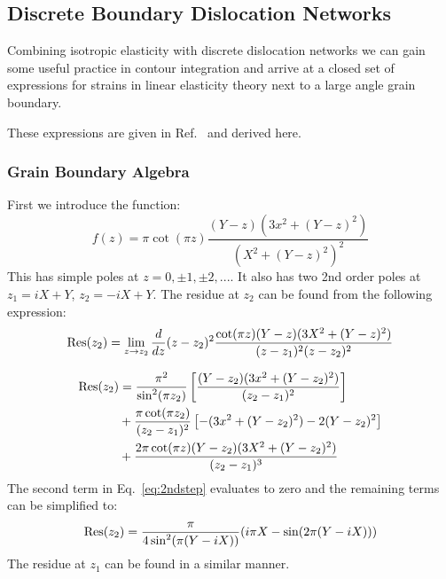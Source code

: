 \subsection{Discrete Boundary Dislocation Networks}
Combining isotropic elasticity with discrete dislocation networks
we can gain some useful practice in contour integration and arrive
at a closed set of expressions for strains in linear elasticity
theory next to a large angle grain boundary. 

These expressions are given in Ref.~\cite{sutton95} and derived here.

\subsubsection{Grain Boundary Algebra}
\label{gbalgebra}
First we introduce the function:
%
\begin{equation}
f(z) =  \pi\cot(\pi z)\frac{(Y-z)(3x^{2} + (Y-z)^{2})}{(X^{2} + (Y-z)^{2})^{2}}
\end{equation}
%
This has simple poles at $z = 0, \pm 1, \pm 2,...$. It also has two 2nd 
order poles at  $z_{1}=iX+Y$, $z_{2}=-iX+Y$. The residue at $z_{2}$ can
be found from the following expression: 
%
\begin{equation}
{\rm Res}(z_{2}) = \lim_{z\rightarrow z_{2}}\frac{d}{dz}(z-z_{2})^{2}
\frac{\cot(\pi z)(Y-z)(3X^{2}+(Y-z)^2)}{(z-z_{1})^{2}(z-z_{2})^{2}}
\end{equation}


\begin{align}
\label{eq:2ndstep}
{\rm Res}(z_{2})&=\frac{\pi^{2}}{\sin^{2}(\pi z_{2})}\left[\frac{(Y-z_{2})(3x^{2}+(Y-z_{2})^{2})}{(z_{2}-z_{1})^{2}}\right]\\
  &+\frac{\pi\cot(\pi z_{2})}{(z_{2}-z_{1})^{2}}\left[-(3x^{2} + (Y-z_{2})^{2})-2(Y-z_{2})^{2}\right] \\
  &+\frac{2\pi\cot(\pi z)(Y-z_{2})(3X^{2}+(Y-z_{2})^{2})}{(z_{2} - z_{1})^{3}}
\end{align}
%
The second term in Eq.~\ref{eq:2ndstep} evaluates to zero and the remaining terms can be simplified to:
%
\begin{equation}
{\rm Res}(z_{2}) = \frac{\pi}{4\sin^{2}(\pi(Y-iX))}(i\pi X - \sin(2\pi(Y-iX)))
\end{equation}
%
The residue at $z_{1}$ can be found in a similar manner.

